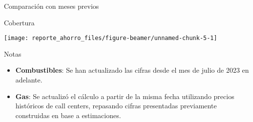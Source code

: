 \documentclass[
  ignorenonframetext,
]{beamer}
\providecommand{\tightlist}{%
  \setlength{\itemsep}{0pt}\setlength{\parskip}{0pt}}
\begin{document}
\begin{frame}{Comparación con meses previos}
\protect\hypertarget{comparaciuxf3n-con-meses-previos-1}{}
\begin{block}{Cobertura}
\protect\hypertarget{cobertura}{}
\footnotesize

\texttt{[image: reporte\_ahorro\_files/figure-beamer/unnamed-chunk-5-1]}
\end{block}
\end{frame}

\begin{frame}{Notas}
\protect\hypertarget{notas}{}
\begin{itemize}
\tightlist
\item
  \textbf{Combustibles}: Se han actualizado las cifras desde el mes de
  julio de 2023 en adelante.
\item
  \textbf{Gas}: Se actualizó el cálculo a partir de la misma fecha
  utilizando precios históricos de call centers, repasando cifras
  presentadas previamente construidas en base a estimaciones.
\end{itemize}
\end{frame}
\end{document}
